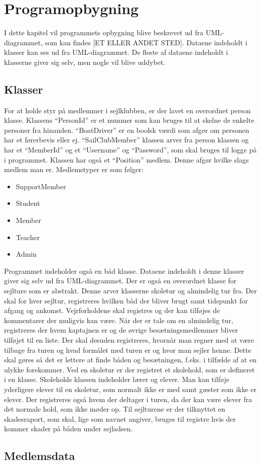 \chapter{Programopbygning}

I dette kapitel vil programmets opbygning blive beskrevet ud fra UML-diagrammet, som kan findes [ET ELLER ANDET STED]. Dataene indeholdt i klasser kan ses ud fra UML-diagrammet. De fleste af dataene indeholdt i klasserne giver sig selv, men nogle vil blive uddybet.


\section{Klasser}

For at holde styr på medlemmer i sejlklubben, er der lavet en overordnet person klasse. Klassens ``PersonId'' er et nummer som kan bruges til at skelne de enkelte personer fra hinanden. ``BoatDriver'' er en boolsk værdi som afgør om personen har et førerbevis eller ej.
``SailClubMember'' klassen arver fra person klassen og har et ``MemberId'' og et ``Username'' og ``Password'', som skal bruges til logge på i programmet. Klassen har også et ``Position'' medlem. Denne afgør hvilke slags medlem man er. Medlemstyper er som følger:

\begin{itemize}
\item SupportMember
\item Student
\item Member
\item Teacher
\item Admin
\end{itemize}

Programmet indeholder også en båd klasse. Dataene indeholdt i denne klasser giver sig selv ud fra UML-diagrammet.
Der er også en overordnet klasse for sejlture som er abstrakt. Denne arver klasserne skoletur og almindelig tur fra. Der skal for hver sejltur, registreres hvilken båd der bliver brugt samt tidspunkt for afgang og ankomst. Vejrforholdene skal registres og der kan tilføjes de kommentarer der muligvis kan være.
Når der er tale om en almindelig tur, registreres der hvem kaptajnen er og de øvrige besætningsmedlemmer bliver tilføjet til en liste. Der skal desuden registreres, hvornår man regner med at være tilbage fra turen og hvad formålet med turen er og hvor man sejler henne. Dette skal gøres så det er lettere at finde båden og besætningen, f.eks. i tilfælde af at en ulykke forekommer.
Ved en skoletur er der registret et skolehold, som er defineret i en klasse. Skoleholds klassen indeholder lærer og elever. Man kan tilføje yderligere elever til en skoletur, som normalt ikke er med samt gæster som ikke er elever. Der registreres også hvem der deltager i turen, da der kan være elever fra det normale hold, som ikke møder op.
Til sejlturene er der tilknyttet en skadesraport, som skal, lige som navnet angiver, bruges til registre hvis der kommer skader på båden under sejladsen. 


\section{Medlemsdata}

